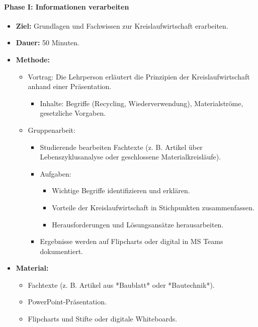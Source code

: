 \documentclass[
11pt,
captions=tableheading,
smallheadings,
headsepline,
footsepline, 
captions=tableheading,
parskip=half-,
]{scrartcl}
\begin{document}
\paragraph{Phase I: Informationen verarbeiten}
\begin{itemize}
    \item \textbf{Ziel:} Grundlagen und Fachwissen zur Kreislaufwirtschaft erarbeiten.
    \item \textbf{Dauer:} 50 Minuten.
    \item \textbf{Methode:}
    \begin{itemize}
        \item Vortrag: Die Lehrperson erläutert die Prinzipien der Kreislaufwirtschaft anhand einer Präsentation.
        \begin{itemize}
            \item Inhalte: Begriffe (Recycling, Wiederverwendung), Materialströme, gesetzliche Vorgaben.
        \end{itemize}
        \item Gruppenarbeit: 
        \begin{itemize}
            \item Studierende bearbeiten Fachtexte (z. B. Artikel über Lebenszyklusanalyse oder geschlossene Materialkreisläufe).
            \item Aufgaben:
            \begin{itemize}
                \item Wichtige Begriffe identifizieren und erklären.
                \item Vorteile der Kreislaufwirtschaft in Stichpunkten zusammenfassen.
                \item Herausforderungen und Lösungsansätze herausarbeiten.
            \end{itemize}
            \item Ergebnisse werden auf Flipcharts oder digital in MS Teams dokumentiert.
        \end{itemize}
    \end{itemize}
    \item \textbf{Material:}
    \begin{itemize}
        \item Fachtexte (z. B. Artikel aus *Baublatt* oder *Bautechnik*).
        \item PowerPoint-Präsentation.
        \item Flipcharts und Stifte oder digitale Whiteboards.
    \end{itemize}
\end{itemize}
\end{document}
